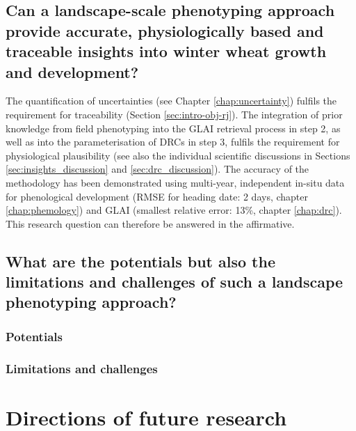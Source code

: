 \subsection{Can a landscape-scale phenotyping approach provide accurate, physiologically based and traceable insights into winter wheat growth and development?}
The quantification of uncertainties (see Chapter \ref{chap:uncertainty}) fulfils the requirement for traceability (Section \ref{sec:intro-obj-rj}). The integration of prior knowledge from field phenotyping into the \gls{GLAI} retrieval process in step 2, as well as into the parameterisation of \gls{DRC}s in step 3, fulfils the requirement for physiological plausibility (see also the individual scientific discussions in Sections \ref{sec:insights_discussion} and \ref{sec:drc_discussion}). The accuracy of the methodology has been demonstrated using multi-year, independent in-situ data for phenological development (RMSE for heading date: 2 days, chapter \ref{chap:phemology}) and GLAI (smallest relative error: 13\%, chapter \ref{chap:drc}). This research question can therefore be answered in the affirmative.

\subsection{What are the potentials but also the limitations and challenges of such a landscape phenotyping approach?}

\subsubsection{Potentials}

\subsubsection{Limitations and challenges}


\section{Directions of future research}